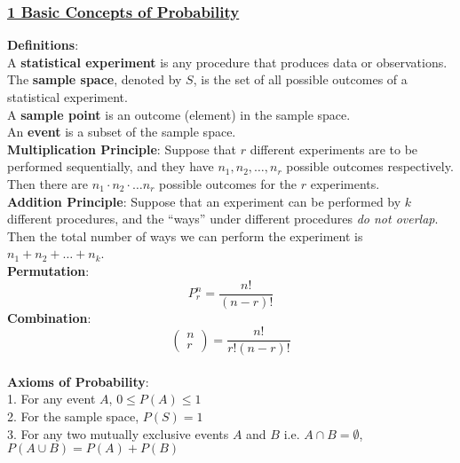 \documentclass{article}
\begin{document}
\titlespacing*{\subsubsection}{0pt}{0pt}{1pt}

\pagestyle{fancy}
\fancyhf{}
\renewcommand{\headrulewidth}{0pt}

\onehalfspacing

\begin{multicols*}{2}

\subsubsection*{\underline{1 Basic Concepts of Probability}}
\vspace{-0.2cm}
\textbf{Definitions}: \\A \textbf{statistical experiment} is any procedure that produces data or observations. \\ The \textbf{sample space}, denoted by $S$, is the set of all possible outcomes of a statistical experiment. \\ A \textbf{sample point} is an outcome (element) in the sample space.\\ An \textbf{event} is a subset of the sample space.\\
\textbf{Multiplication Principle}: Suppose that $r$ different experiments are to be performed sequentially, and they have $n_1,n_2,\dots,n_r$ possible outcomes respectively. Then there are $n_1\cdot n_2\cdot\dots n_r$ possible outcomes for the $r$ experiments.\\
\textbf{Addition Principle}: Suppose that an experiment can be performed by $k$ different procedures, and the ``ways'' under different procedures \textit{do not overlap}. Then the total number of ways we can perform the experiment is $n_1+n_2+\dots+n_k$.\\
\textbf{Permutation}: $$P^n_r=\frac{n!}{(n-r)!}$$
\textbf{Combination}: $$\begin{pmatrix}n \\ r\end{pmatrix}=\frac{n!}{r!(n-r)!}$$ \\
\textbf{Axioms of Probability}: \\
1. For any event $A$, $0\leq P(A)\leq 1$ \\
2. For the sample space, $P(S) = 1$\\
3. For any two mutually exclusive events $A$ and $B$ i.e. $A\cap B=\emptyset$, $P(A\cup B)=P(A)+P(B)$\\

\end{multicols*}
\end{document}
